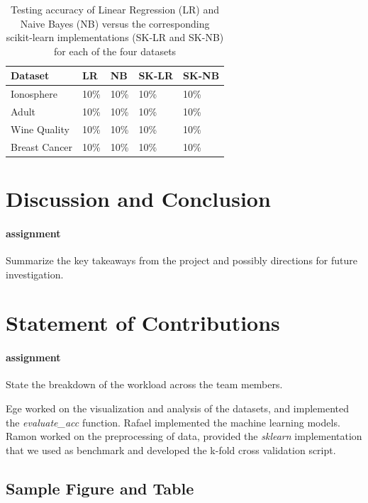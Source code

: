 \documentclass{article}
\begin{document}
\begin{table}
  \caption{Testing accuracy of Linear Regression (LR) and Naive Bayes (NB) versus the corresponding scikit-learn implementations (SK-LR and SK-NB) for each of the four datasets}
  \label{table:accuracy}
  \centering
  \begin{tabular}{lllll}
    \toprule
    Dataset       & LR   & NB   & SK-LR & SK-NB \\
    \midrule
    Ionosphere    & 10\% & 10\% & 10\% & 10\%  \\
    Adult         & 10\% & 10\% & 10\% & 10\%  \\
    Wine Quality  & 10\% & 10\% & 10\% & 10\%  \\
    Breast Cancer & 10\% & 10\% & 10\% & 10\%  \\
    \bottomrule
  \end{tabular}
\end{table}

\section{Discussion and Conclusion}
\label{section:discussion}

\paragraph{assignment} Summarize the key takeaways from the project and possibly directions for future investigation.

\section{Statement of Contributions}
\label{section:contributions}

\paragraph{assignment} State the breakdown of the workload across the team members.

Ege worked on the visualization and analysis of the datasets, and implemented the \textit{evaluate\_acc} function. Rafael implemented the machine learning models. Ramon worked on the preprocessing of data, provided the \textit{sklearn} implementation that we used as benchmark and developed the k-fold cross validation script.

\subsection{Sample Figure and Table}
\end{document}
